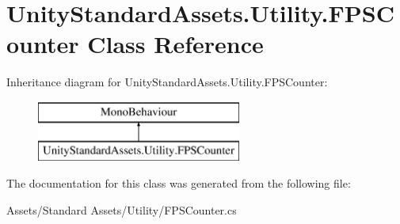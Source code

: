 \hypertarget{class_unity_standard_assets_1_1_utility_1_1_f_p_s_counter}{}\section{Unity\+Standard\+Assets.\+Utility.\+F\+P\+S\+Counter Class Reference}
\label{class_unity_standard_assets_1_1_utility_1_1_f_p_s_counter}
Inheritance diagram for Unity\+Standard\+Assets.\+Utility.\+F\+P\+S\+Counter\+:\begin{figure}[H]
\begin{center}
\leavevmode
\includegraphics[height=2.000000cm]{class_unity_standard_assets_1_1_utility_1_1_f_p_s_counter}
\end{center}
\end{figure}


The documentation for this class was generated from the following file\+:\begin{DoxyCompactItemize}
\item 
Assets/\+Standard Assets/\+Utility/F\+P\+S\+Counter.\+cs\end{DoxyCompactItemize}
